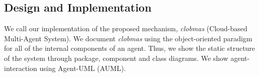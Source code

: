 \documentclass[10pt,journal,compsoc]{IEEEtran}
\begin{document}
\subsection{Design and Implementation}
We call our implementation of the proposed mechanism, \textit{clobmas} (Cloud-based Multi-Agent System). We document \textit{clobmas} using the object-oriented paradigm for all of the internal components of an agent. Thus, we show the static structure of the system through package, component and class diagrams. We show agent-interaction using Agent-UML (AUML).	
%
\end{document}
